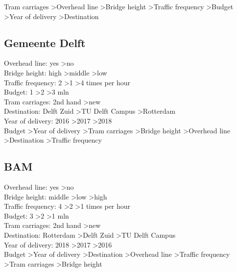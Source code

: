 \documentclass{article}
\begin{document}
Tram carriages \textgreater Overhead line \textgreater Bridge height \textgreater Traffic frequency \textgreater Budget \textgreater Year of delivery \textgreater Destination\\


\subsection{Gemeente Delft}
Overhead line: yes \textgreater no \\
Bridge height: high \textgreater middle \textgreater low \\
Traffic frequency: 2 \textgreater 1 \textgreater 4 times per hour \\
Budget: 1 \textgreater 2 \textgreater 3 mln \\
Tram carriages: 2nd hand \textgreater new \\
Destination: Delft Zuid \textgreater TU Delft Campus \textgreater Rotterdam \\
Year of delivery: 2016 \textgreater 2017 \textgreater 2018 \\

Budget \textgreater Year of delivery \textgreater Tram carriages \textgreater Bridge height \textgreater Overhead line \textgreater Destination \textgreater Traffic frequency\\


\subsection{BAM}
Overhead line: yes \textgreater no \\
Bridge height: middle \textgreater low \textgreater high \\
Traffic frequency: 4 \textgreater 2 \textgreater 1 times per hour \\
Budget: 3 \textgreater 2 \textgreater 1 mln \\
Tram carriages: 2nd hand \textgreater new \\
Destination: Rotterdam \textgreater Delft Zuid \textgreater TU Delft Campus \\
Year of delivery: 2018 \textgreater 2017 \textgreater 2016 \\

Budget \textgreater Year of delivery \textgreater Destination \textgreater Overhead line \textgreater Traffic frequency \textgreater Tram carriages \textgreater Bridge height\\
\end{document}
